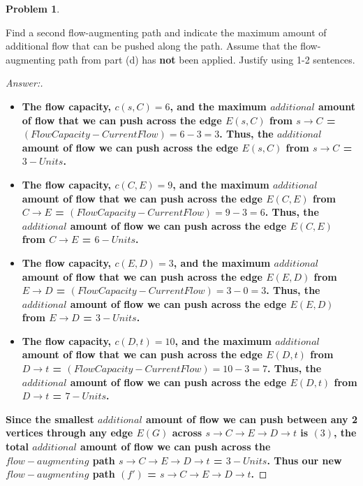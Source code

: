 \documentclass[11pt]{article}
\theoremstyle{definition}
\theoremstyle{definition}
\newtheorem{required}{Problem}
\theoremstyle{definition}
\begin{document}
\begin{required}
\begin{enumerate}[label=(\alph*)]
\vskip 10pt
\item Find a second flow-augmenting path and indicate the maximum amount of additional flow that can be pushed along the path. Assume that the flow-augmenting path from part (d) has \textbf{not} been applied. Justify using 1-2 sentences.

\begin{proof}[Answer:] \
\begin{itemize}
\item \textbf{The flow capacity, $c(s, C) = 6$, and the maximum $additional$ amount of flow that we can push across the edge  $E(s, C)$ from $s \to C$ = $(Flow Capacity - Current Flow) = 6 - 3 = 3$. Thus, the $additional$ amount of flow we can push across the edge $E(s, C)$ from $s \to C$ = $3-Units$.}
\item \textbf{The flow capacity, $c(C, E) = 9$, and the maximum $additional$ amount of flow that we can push across the edge  $E(C, E)$ from $C \to E$ = $(Flow Capacity - Current Flow) = 9 - 3 = 6$. Thus, the $additional$ amount of flow we can push across the edge $E(C, E)$ from $C \to E$ = $6-Units$.}
\item \textbf{The flow capacity, $c(E, D) = 3$, and the maximum $additional$ amount of flow that we can push across the edge  $E(E, D)$ from $E \to D$ = $(Flow Capacity - Current Flow) = 3 - 0 = 3$. Thus, the $additional$ amount of flow we can push across the edge $E(E, D)$ from $E \to D$ = $3-Units$.}
\item \textbf{The flow capacity, $c(D, t) = 10$, and the maximum $additional$ amount of flow that we can push across the edge  $E(D, t)$ from $D \to t$ = $(Flow Capacity - Current Flow) = 10 - 3 = 7$. Thus, the $additional$ amount of flow we can push across the edge $E(D, t)$ from $D \to t$ = $7-Units$.}
\end{itemize}
\item \textbf{Since the smallest $additional$ amount of flow we can push between any 2 vertices through any edge $E(G)$ across $s \to C \to E \to D \to t$ is $(3)$, the total $additional$ amount of flow we can push across the $flow-augmenting$ path $s \to C \to E \to D \to t$ = \color{red}$3-Units$\color{black}. Thus our new $flow-augmenting$ path $(f')$ = \color{red}$s \to C \to E \to D \to t$\color{black}.}
\end{proof}
\end{enumerate}
\end{required}
\end{document}
